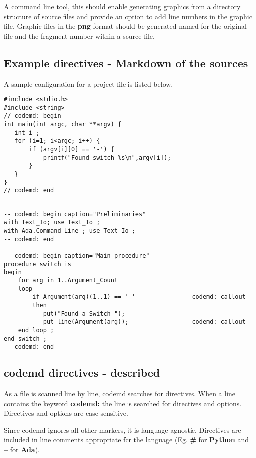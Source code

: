 \documentclass[12pt, a4paper]{article}
\begin{document}
A command line tool, this should enable generating graphics from a directory structure of source files and provide an option to add line numbers in the graphic file. Graphic files in the \textbf{png} format should be generated named for the original file and the fragment number within a source file.

\subsection{Example directives - Markdown of the sources}

A sample configuration for a project file is listed below.

\begin{lstlisting}[caption=Example Source file in C]
#include <stdio.h>
#include <string>
// codemd: begin
int main(int argc, char **argv) {
   int i ;
   for (i=1; i<argc; i++) {
       if (argv[i][0] == '-') {
           printf("Found switch %s\n",argv[i]);
       }
   }
}
// codemd: end
\end{lstlisting}

\begin{lstlisting}[caption=Example Source file in Ada]

-- codemd: begin caption="Preliminaries"
with Text_Io; use Text_Io ;
with Ada.Command_Line ; use Text_Io ;
-- codemd: end

-- codemd: begin caption="Main procedure"
procedure switch is
begin
    for arg in 1..Argument_Count
    loop
        if Argument(arg)(1..1) == '-'             -- codemd: callout
        then
           put("Found a Switch ");
           put_line(Argument(arg));               -- codemd: callout
    end loop ;
end switch ;
-- codemd: end
\end{lstlisting}

\subsection{codemd directives - described}

As a file is scanned line by line, codemd searches for directives. When a line contains the keyword \textbf{codemd:} the line is searched for directives and options. Directives and options are case sensitive.

Since codemd ignores all other markers, it is language agnostic. Directives are included in line comments appropriate for the language (Eg. \textbf{\#} for \textbf{Python} and \textbf{--} for \textbf{Ada}). 
\end{document}

